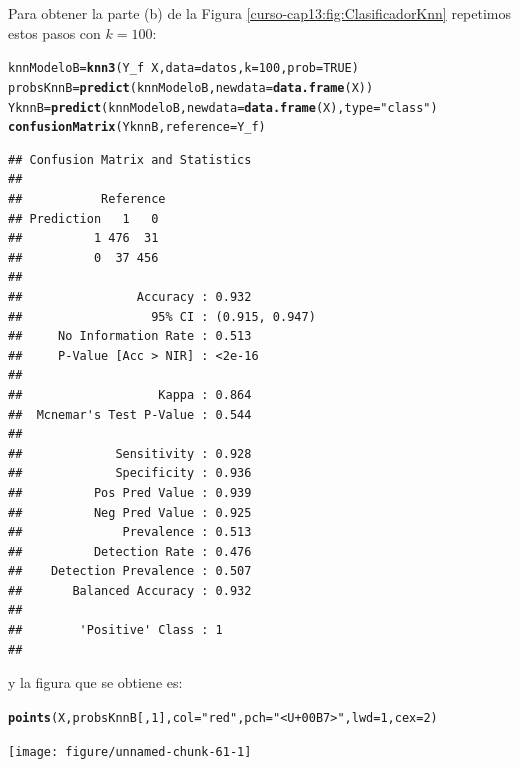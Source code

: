 \documentclass[10pt,a4paper]{article}\usepackage[]{graphicx}\usepackage[]{color}
\makeatletter
\newcommand{\hlnum}[1]{\textcolor[rgb]{0.686,0.059,0.569}{#1}}%
\newcommand{\hlstr}[1]{\textcolor[rgb]{0.192,0.494,0.8}{#1}}%
\newcommand{\hlopt}[1]{\textcolor[rgb]{0,0,0}{#1}}%
\newcommand{\hlstd}[1]{\textcolor[rgb]{0.345,0.345,0.345}{#1}}%
\newcommand{\hlkwb}[1]{\textcolor[rgb]{0.69,0.353,0.396}{#1}}%
\newcommand{\hlkwc}[1]{\textcolor[rgb]{0.333,0.667,0.333}{#1}}%
\newcommand{\hlkwd}[1]{\textcolor[rgb]{0.737,0.353,0.396}{\textbf{#1}}}%
\newenvironment{kframe}{%
 \def\at@end@of@kframe{}%
 \ifinner\ifhmode%
  \def\at@end@of@kframe{\end{minipage}}%
  \begin{minipage}{\columnwidth}%
 \fi\fi%
 \def\FrameCommand##1{\hskip\@totalleftmargin \hskip-\fboxsep
 \colorbox{shadecolor}{##1}\hskip-\fboxsep
     \hskip-\linewidth \hskip-\@totalleftmargin \hskip\columnwidth}%
 \MakeFramed {\advance\hsize-\width
   \@totalleftmargin\z@ \linewidth\hsize
   \@setminipage}}%
 {\par\unskip\endMakeFramed%
 \at@end@of@kframe}
\newenvironment{knitrout}{}{} %
\makeatother
\begin{document}
Para obtener la parte (b) de la Figura \ref{curso-cap13:fig:ClasificadorKnn} repetimos estos pasos con $k=100$:

\begin{knitrout}
\color{fgcolor}\begin{kframe}
\begin{alltt}
\hlstd{knnModeloB} \hlkwb{=} \hlkwd{knn3}\hlstd{(Y_f} \hlopt{~} \hlstd{X,} \hlkwc{data} \hlstd{= datos,} \hlkwc{k}\hlstd{=}\hlnum{100}\hlstd{,} \hlkwc{prob}\hlstd{=}\hlnum{TRUE}\hlstd{)}
\hlstd{probsKnnB} \hlkwb{=} \hlkwd{predict}\hlstd{(knnModeloB,} \hlkwc{newdata} \hlstd{=} \hlkwd{data.frame}\hlstd{(X))}
\hlstd{YknnB} \hlkwb{=} \hlkwd{predict}\hlstd{(knnModeloB,} \hlkwc{newdata} \hlstd{=} \hlkwd{data.frame}\hlstd{(X),} \hlkwc{type}\hlstd{=}\hlstr{"class"}\hlstd{)}
\hlkwd{confusionMatrix}\hlstd{(YknnB,} \hlkwc{reference} \hlstd{= Y_f)}
\end{alltt}
\begin{verbatim}
## Confusion Matrix and Statistics
## 
##           Reference
## Prediction   1   0
##          1 476  31
##          0  37 456
##                                         
##                Accuracy : 0.932         
##                  95% CI : (0.915, 0.947)
##     No Information Rate : 0.513         
##     P-Value [Acc > NIR] : <2e-16        
##                                         
##                   Kappa : 0.864         
##  Mcnemar's Test P-Value : 0.544         
##                                         
##             Sensitivity : 0.928         
##             Specificity : 0.936         
##          Pos Pred Value : 0.939         
##          Neg Pred Value : 0.925         
##              Prevalence : 0.513         
##          Detection Rate : 0.476         
##    Detection Prevalence : 0.507         
##       Balanced Accuracy : 0.932         
##                                         
##        'Positive' Class : 1             
## 
\end{verbatim}
\end{kframe}
\end{knitrout}

y la figura que se obtiene es:

\begin{knitrout}
\color{fgcolor}\begin{kframe}
\begin{alltt}
\hlkwd{points}\hlstd{(X, probsKnnB[ ,} \hlnum{1}\hlstd{],} \hlkwc{col}\hlstd{=}\hlstr{"red"}\hlstd{,} \hlkwc{pch}\hlstd{=}\hlstr{"<U+00B7>"}\hlstd{,} \hlkwc{lwd}\hlstd{=}\hlnum{1}\hlstd{,} \hlkwc{cex}\hlstd{=}\hlnum{2}\hlstd{)}
\end{alltt}
\end{kframe}

{\centering \texttt{[image: figure/unnamed-chunk-61-1]} 

}



\end{knitrout}
\end{document}
